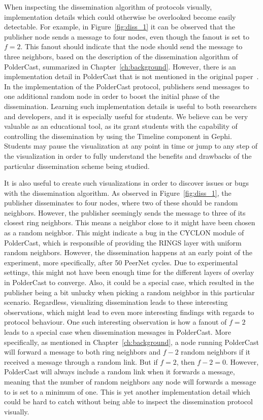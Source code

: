 When inspecting the dissemination algorithm of protocols visually,
implementation details which could otherwise be overlooked become easily
detectable. For example, in Figure~\ref{fig:diss_1} it can be observed
that the publisher node sends a message to four nodes, even though the
fanout is set to $f=2$.  This fanout should indicate that the node
should send the message to three neighbors, based on the description of
the dissemination algorithm of PolderCast, summarized in
Chapter~\ref{ch:background}.  However, there is an implementation detail
in PolderCast that is not mentioned in the original
paper~\cite{Setty:2012}. In the implementation of the PolderCast
protocol, publishers send messages to one additional random node in
order to boost the initial phase of the dissemination. Learning such
implementation details is useful to both researchers and developers, and
it is especially useful for students. We believe \demo can be very
valuable as an educational tool, as its grant students with the
capability of controlling the dissemination by using the Timeline
component in Gephi. Students may pause the visualization at any point in
time or jump to any step of the visualization in order to fully
understand the benefits and drawbacks of the particular dissemination
scheme being studied.

It is also useful to create such visualizations in order to discover
issues or bugs with the dissemination algorithm. As observed in
Figure~\ref{fig:diss_1}, the publisher disseminates to four nodes, where
two of these should be random neighbors. However, the publisher
seemingly sends the message to three of its closest ring neighbors.
This means a neighbor close to it might have been chosen as a random
neighbor. This might indicate a bug in the CYCLON module of PolderCast,
which is responsible of providing the RINGS layer with uniform random
neighbors.  However, the dissemination happens at an early point of the
experiment, more specifically, after 50 PeerNet cycles. Due to
experimental settings, this might not have been enough time for the
different layers of overlay in PolderCast to converge. Also, it could be
a special case, which resulted in the publisher being a bit unlucky when
picking a random neighbor in this particular scenario. Regardless,
visualizing dissemination leads to these interesting observations, which
might lead to even more interesting findings with regards to protocol
behaviour.  One such interesting observation is how a fanout of $f=2$
leads to a special case when dissemination messages in PolderCast. More
specifically, as mentioned in Chapter~\ref{ch:background}, a node
running PolderCast will forward a message to both ring neighbors and
$f-2$ random neighbors if it received a message through a random link.
But if $f=2$, then $f-2 = 0$. However, PolderCast will always include a
random link when it forwards a message, meaning that the number of
random neighbors any node will forwards a message to is set to a minimum
of one. This is yet another implementation detail which could be hard to
catch without being able to inspect the dissemination protocol visually.

